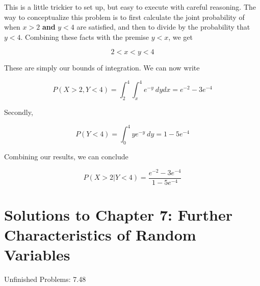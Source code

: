 \documentclass[10pt, oneside]{article}
\begin{document}
\begin{enumerate}[label=6.\arabic*]
\begin{enumerate}
	This is a little trickier to set up, but easy to execute with careful reasoning. The way to conceptualize this problem is to first calculate the joint probability of when $x > 2$ \textbf{and} $y < 4$ are satisfied, and then to divide by the probability that $y < 4$. Combining these facts with the premise $y < x$, we get
	
	\[ 2 < x < y < 4 \]
	
	These are simply our bounds of integration. We can now write
	
	\[ P(X > 2, Y < 4) = \int^4_2 \int^4_x e^{-y} \ dy dx = e^{-2} -3e^{-4}  \]
	
	Secondly, 
	
	\[ P(Y < 4) = \int^4_0 y e^{-y} \ dy = 1 - 5 e^{-4} \]
	
	Combining our results, we can conclude
	
	\[ \boxed{ P(X > 2 | Y < 4) = \frac{e^{-2} - 3e^{-4} }{1 - 5e^{-4}} } \]

\end{enumerate}

\end{enumerate}

\newpage


\setcounter{cor}{0}
\setcounter{prop}{0}
\setcounter{cor*}{0}

{}
\section*{Solutions to Chapter 7: Further Characteristics of Random Variables}

Unfinished Problems: 7.48
\end{document}
